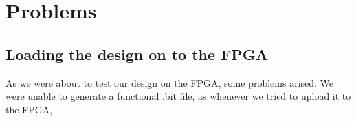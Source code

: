 \section{Problems}

\subsection{Loading the design on to the FPGA}

As we were about to test our design on the FPGA, some problems arised. We were
unable to generate a functional .bit file, as whenever we tried to upload it to
the FPGA, 
